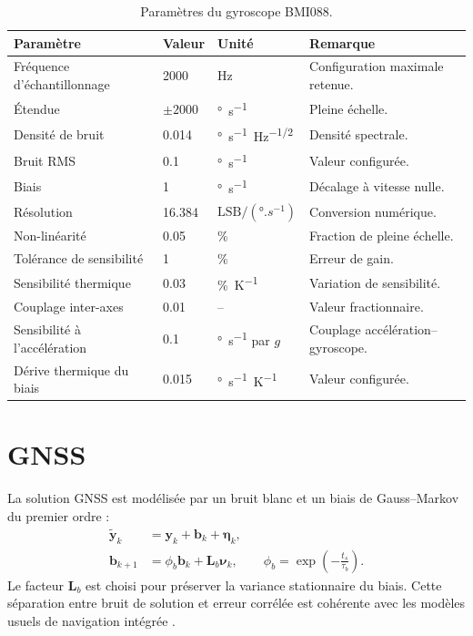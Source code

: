\documentclass[11pt,a4paper,oneside]{report}
\newcommand{\vect}[1]{\bm{#1}}
\newcommand{\mat}[1]{\bm{#1}}
\begin{document}
	\begin{table}[H]
		\centering
		\caption{Paramètres du gyroscope BMI088.}
		\label{tab_gyro}
		\begin{tabularx}{\textwidth}{@{}L{5.2cm}L{3.3cm}L{2.8cm}Y@{}}
			\toprule
			\textbf{Paramètre} & \textbf{Valeur} & \textbf{Unité} & \textbf{Remarque}\\
			\midrule
			Fréquence d'échantillonnage & \num{2000} & \si{Hz} & Configuration maximale retenue.\\
			Étendue & $\pm\num{2000}$ & \si{\degree.s^{-1}} & Pleine échelle.\\
			Densité de bruit & \num{0.014} & \si{\degree.s^{-1}.Hz^{-1/2}} & Densité spectrale.\\
			Bruit RMS & \num{0.1} & \si{\degree.s^{-1}} & Valeur configurée.\\
			Biais & \num{1} & \si{\degree.s^{-1}} & Décalage à vitesse nulle.\\
			Résolution & \num{16.384} & $\text{LSB}/(\si{\degree.s^{-1}})$ & Conversion numérique.\\
			Non-linéarité & \num{0.05} & \si{\percent} & Fraction de pleine échelle.\\
			Tolérance de sensibilité & \num{1} & \si{\percent} & Erreur de gain.\\
			Sensibilité thermique & \num{0.03} & \si{\percent.K^{-1}} & Variation de sensibilité.\\
			Couplage inter-axes & \num{0.01} & -- & Valeur fractionnaire.\\
			Sensibilité à l'accélération & \num{0.1} & \si{\degree.s^{-1}} par $g$ & Couplage accélération--gyroscope.\\
			Dérive thermique du biais & \num{0.015} & \si{\degree.s^{-1}.K^{-1}} & Valeur configurée.\\
			\bottomrule
		\end{tabularx}
	\end{table}
	
	\section{GNSS}
	La solution GNSS est modélisée par un bruit blanc et un biais de Gauss--Markov du premier ordre :
	\begin{subequations}
		\label{eq_gnss_model}
		\begin{align}
			\tilde{\vect y}_k&=\vect y_k+\vect b_k+\vect\eta_k,\\
			\vect b_{k+1}&=\phi_b\vect b_k+\mat L_b\vect\nu_k,
			\qquad
			\phi_b=\exp\left(-\frac{t_s}{\tau_b}\right).
		\end{align}
	\end{subequations}
	Le facteur $\mat L_b$ est choisi pour préserver la variance stationnaire du biais. Cette séparation entre bruit de solution et erreur corrélée est cohérente avec les modèles usuels de navigation intégrée \cite{Groves2013}.
	
\end{document}

